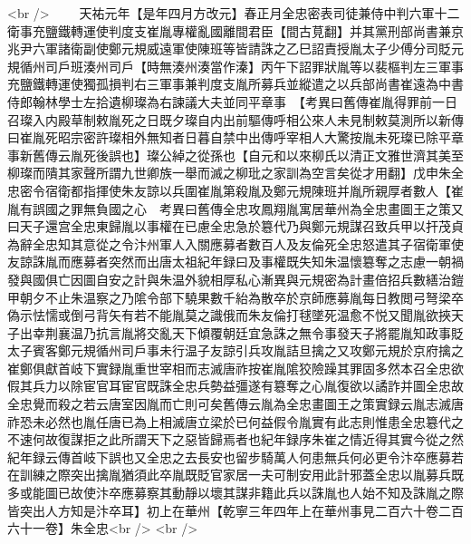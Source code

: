 <br />
　　天祐元年【是年四月方改元】春正月全忠密表司徒兼侍中判六軍十二衛事充鹽鐵轉運使判度支崔胤專權亂國離間君臣【間古莧翻】并其黨刑部尚書兼京兆尹六軍諸衛副使鄭元規威遠軍使陳班等皆請誅之乙巳詔責授胤太子少傅分司貶元規循州司戶班湊州司戶【時無湊州湊當作溱】丙午下詔罪狀胤等以裴樞判左三軍事充鹽鐵轉運使獨孤損判右三軍事兼判度支胤所募兵並縱遣之以兵部尚書崔遠為中書侍郎翰林學士左拾遺柳璨為右諫議大夫並同平章事　【考異曰舊傳崔胤得罪前一日召璨入内殿草制敕胤死之日既夕璨自内出前驅傳呼相公來人未見制敕莫測所以新傳曰崔胤死昭宗密許璨相外無知者日暮自禁中出傳呼宰相人大驚按胤未死璨已除平章事新舊傳云胤死後誤也】璨公綽之從孫也【自元和以來柳氏以清正文雅世濟其美至柳璨而隤其家聲所謂九世卿族一舉而滅之柳玭之家訓為空言矣從才用翻】戊申朱全忠密令宿衛都指揮使朱友諒以兵圍崔胤第殺胤及鄭元規陳班并胤所親厚者數人【崔胤有誤國之罪無負國之心　考異曰舊傳全忠攻鳳翔胤寓居華州為全忠畫圖王之策又曰天子還宫全忠東歸胤以事權在已慮全忠急於簒代乃與鄭元規謀召致兵甲以扞茂貞為辭全忠知其意從之令汴州軍人入關應募者數百人及友倫死全忠怒遣其子宿衛軍使友諒誅胤而應募者突然而出唐太祖紀年録曰及事權既失知朱温懷簒奪之志慮一朝禍發與國俱亡因圖自安之計與朱温外貌相厚私心漸異與元規密為計畫倍招兵數繕治鎧甲朝夕不止朱温察之乃隂令部下驍果數千紿為散卒於京師應募胤每日教閲弓弩梁卒偽示怯懦或倒弓背矢有若不能胤莫之識俄而朱友倫打毬墜死温愈不悦又聞胤欲挾天子出幸荆襄温乃抗言胤將交亂天下傾覆朝廷宜急誅之無令事發天子將罷胤知政事貶太子賓客鄭元規循州司戶事未行温子友諒引兵攻胤詰旦擒之又攻鄭元規於京府擒之崔鄭俱獻首岐下實録胤重世宰相而志滅唐祚按崔胤隂狡險躁其罪固多然本召全忠欲假其兵力以除宦官耳宦官既誅全忠兵勢益彊遂有簒奪之心胤復欲以譎詐并圖全忠故全忠覺而殺之若云唐室因胤而亡則可矣舊傳云胤為全忠畫圖王之策實録云胤志滅唐祚恐未必然也胤任唐已為上相滅唐立梁於已何益假令胤實有此志則惟患全忠簒代之不速何故復謀拒之此所謂天下之惡皆歸焉者也紀年録序朱崔之情近得其實今從之然紀年録云傳首岐下誤也又全忠之去長安也留步騎萬人何患無兵何必更令汴卒應募若在訓練之際突出擒胤猶須此卒胤既貶官家居一夫可制安用此計邪蓋全忠以胤募兵既多或能圖已故使汴卒應募察其動靜以壞其謀非籍此兵以誅胤也人始不知及誅胤之際皆突出人方知是汴卒耳】初上在華州【乾寧三年四年上在華州事見二百六十卷二百六十一卷】朱全忠<br />
<br />
